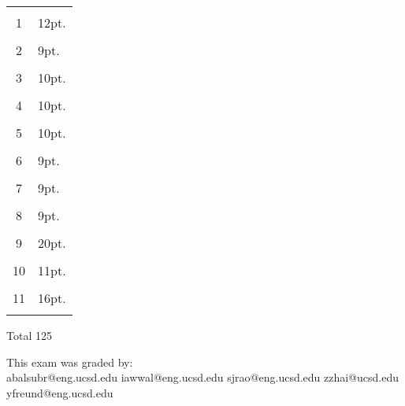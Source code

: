 \begin{center}
\begin{tabular}{|c|l|} \hline
\hspace{1in} & \hspace{1in} \\
1 & 12pt. \\ 
&  \\ \hline
2 & 9pt. \\
&  \\ \hline
3 & 10pt. \\
&  \\ \hline
4 & 10pt.\\
&  \\ \hline
5 & 10pt.\\
&  \\ \hline
6 & 9pt.\\
&  \\ \hline
7 & 9pt.\\
&  \\ \hline
8 & 9pt.\\
&  \\ \hline
9 & 20pt. \\
& \\ \hline
10 & 11pt. \\
& \\ \hline
11 & 16pt. \\
& \\ \hline
\end{tabular}
\end{center}
\begin{center}Total 125\end{center}

\vspace{0.2in}

This exam was graded by:\\
\hspace{1cm}abalsubr@eng.ucsd.edu
\hspace{1cm}iawwal@eng.ucsd.edu
\hspace{1cm}sjrao@eng.ucsd.edu
\hspace{1cm}zzhai@ucsd.edu
\hspace{1cm}yfreund@eng.ucsd.edu


\pagebreak
